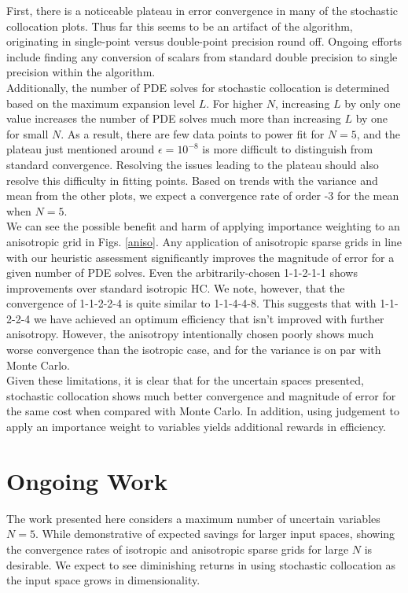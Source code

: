 \documentclass[11pt]{article}
\begin{document}
First, there is a noticeable plateau in error convergence in many of the stochastic collocation plots.  Thus far this seems to be an artifact of the algorithm, originating in single-point versus double-point precision round off.  Ongoing efforts include finding any conversion of scalars from standard double precision to single precision within the algorithm.\\

Additionally, the number of PDE solves for stochastic collocation is determined based on the maximum expansion level $L$.  For higher $N$, increasing $L$ by only one value increases the number of PDE solves much more than increasing $L$ by one for small $N$.  As a result, there are few data points to power fit for $N=5$, and the plateau just mentioned around $\epsilon=10^{-8}$ is more difficult to distinguish from standard convergence.  Resolving the issues leading to the plateau should also resolve this difficulty in fitting points.  Based on trends with the variance and mean from the other plots, we expect a convergence rate of order -3 for the mean when $N=5$.\\

We can see the possible benefit and harm of applying importance weighting to an anisotropic grid in Figs. \ref{aniso}.  Any application of anisotropic sparse grids in line with our heuristic assessment significantly improves the magnitude of error for a given number of PDE solves.  Even the arbitrarily-chosen 1-1-2-1-1 shows improvements over standard isotropic HC.  We note, however, that the convergence of 1-1-2-2-4 is quite similar to 1-1-4-4-8.  This suggests that with 1-1-2-2-4 we have achieved an optimum efficiency that isn't improved with further anisotropy.  However, the anisotropy intentionally chosen poorly shows much worse convergence than the isotropic case, and for the variance is on par with Monte Carlo.\\

Given these limitations, it is clear that for the uncertain spaces presented, stochastic collocation shows much better convergence and magnitude of error for the same cost when compared with Monte Carlo.  In addition, using judgement to apply an importance weight to variables yields additional rewards in efficiency.

\section{Ongoing Work}
The work presented here considers a maximum number of uncertain variables $N=5$.  While demonstrative of expected savings for larger input spaces, showing the convergence rates of isotropic and anisotropic sparse grids for large $N$ is desirable.  We expect to see diminishing returns in using stochastic collocation as the input space grows in dimensionality.\\
\end{document}

